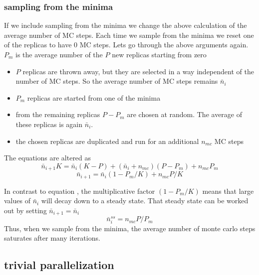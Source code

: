 \documentclass[a4paper]{article}
\begin{document}
\subsubsection{sampling from the minima}

If we include sampling from the minima we change the above calculation of the
average number of MC steps.  Each time we sample from the minima we reset
one of the replicas to have 0 MC steps.  Lets go through the above
arguments again. $P_{m}$ is the average number of the $P$ new replicas starting
from zero

\begin{itemize}
  \item $P$ replicas are thrown away, but they are selected in a way independent of the
    number of MC steps.  So the average number of MC steps remains $\bar{n}_i$

  \item $P_m$ replicas are started from one of the minima
    
  \item from the remaining replicas $P - P_m$ are chosen at random.  The average of these
    replicas is again $\bar{n}_i$.  

  \item the chosen replicas are duplicated and run for an additional $n_{mc}$ MC steps
\end{itemize}
The equations are altered as
\begin{equation}
  \bar{n}_{i+1} K = \bar{n}_i  (K - P) + (\bar{n}_i + n_{mc}) (P - P_m) + n_{mc} P_m
\end{equation}
\begin{equation}
  \bar{n}_{i+1} = \bar{n}_i (1-P_m/K)  +  n_{mc} P / K
\end{equation}

In contrast to equation \label{eqn:par_iter}, the multiplicative factor $(1-P_m/K)$
means that large values of  $\bar{n}_i$ will decay down to a steady state.  That 
steady state can be worked out by setting $\bar{n}_{i+1} = \bar{n}_i$
\begin{equation}
  \bar{n}_{i}^{ss} = n_{mc} P / P_m
\end{equation}
Thus, when we sample from the minima, the average number of monte carlo steps saturates
after many iterations.

\subsection{trivial parallelization}
\end{document}
